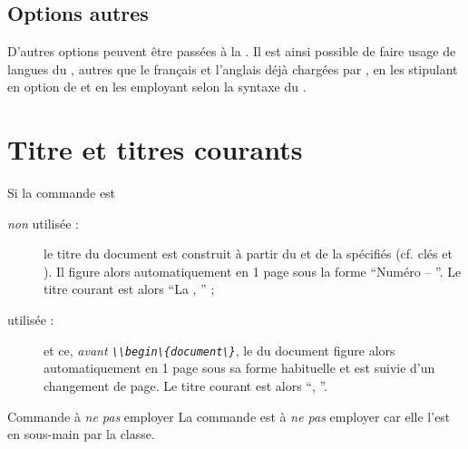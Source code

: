 \documentclass{letgut}
\begin{document}
\subsection{Options autres}
\label{sec:options-autres}

D'autres options peuvent être passées à la . Il est ainsi possible
de faire usage de langues du , autres que le français et
l'anglais déjà chargées par , en les stipulant en option de
 et en les employant selon la syntaxe du
.

\section{Titre et titres courants}
\label{sec:titre}
Si la commande  est
\begin{description}
\item[\emph{non} utilisée :] le titre du document est construit à partir du
   et de la  spécifiés (cf. clés  et
  ). Il figure alors automatiquement en 1\iere{} page sous la forme
  \enquote{Numéro  -- }. Le titre courant est alors
  \enquote{La , } ;
\item[ utilisée\footnotemark{} :]  et
  ce, \emph{avant \lstinline+\\begin\{document\}+}, le  du document
  figure alors automatiquement en 1\iere{} page sous sa forme habituelle et est
  suivie d'un changement de page. Le titre courant est alors
  \enquote{, }.
\end{description}


\begin{dbwarning}{Commande  à \emph{ne pas} employer}{}
  La commande  est à \emph{ne pas} employer car elle
  l'est en sous-main par la classe.
\end{dbwarning}
\end{document}
